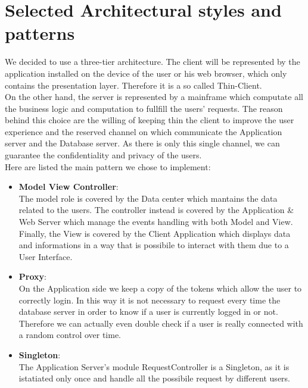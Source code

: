 \documentclass[numbers=noenddot, 12pt, a4paper, oneside]{scrbook}
\begin{document}
\section{Selected Architectural styles and patterns}

We decided to use a three-tier architecture. The client will be represented by the application installed on the device of the user or his web browser, which only contains the presentation layer. Therefore it is a so called Thin-Client.\\

On the other hand, the server is represented by a mainframe which computate all the business logic and computation to fullfill the users' requests. The reason behind this choice are the willing of keeping thin the client to improve the user experience and the reserved channel on which communicate the Application server and the Database server. As there is only this single channel, we can guarantee the confidentiality and privacy of the users. \\

Here are listed the main pattern we chose to implement:
\begin{itemize}
	\item \textbf{Model View Controller}:\\\newline
	The model role is covered by the Data center which mantains the data related to the users. The controller instead is covered by the Application \& Web Server which manage the events handling with both Model and View. Finally, the View is covered by the Client Application which displays data and informations in a way that is possibile to interact with them due to a User Interface.\\
	
	\item \textbf{Proxy}:\\\newline
	On the Application side we keep a copy of the tokens which allow the user to correctly login. In this way it is not necessary to request every time the database server in order to know if a user is currently logged in or not. Therefore we can actually even double check if a user is really connected with a random control over time.\\
	
	\item \textbf{Singleton}:\\\newline
	The Application Server's module RequestController is a Singleton, as it is istatiated only once and handle all the possibile request by different users.\\
	
\end{itemize}
\end{document}
